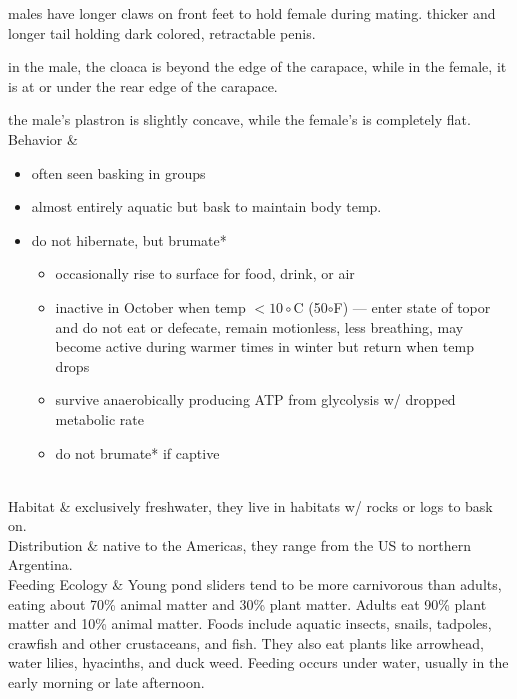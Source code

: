 \begin{center}
\begin{longtabu}
	males have longer claws on front feet to hold female during mating. thicker and longer tail holding dark colored, retractable penis.
	
	in the male, the cloaca is beyond the edge of the carapace, while in the female, it is at or under the rear edge of the carapace.
	
	the male's plastron is slightly concave, while the female's is completely flat.
	\\
	\hline
	Behavior & 
	\begin{itemize}[noitemsep]
		\item often seen basking in groups
		\item almost entirely aquatic but bask to maintain body temp.
		\item do not hibernate, but brumate*
			\begin{itemize}[noitemsep]
				\item occasionally rise to surface for food, drink, or air
				\item inactive in October when temp $< 10\circ$C (50$\circ$F) --- enter state of topor and do not eat or defecate, remain motionless, less breathing, may become active during warmer times in winter but return when temp drops
				\item survive anaerobically producing ATP from glycolysis w/ dropped metabolic rate
				\item do not brumate* if captive
			\end{itemize}
	\end{itemize}	
	\\
	\hline
	Habitat & 
	exclusively freshwater, they live in habitats w/ rocks or logs to bask on.
	\\
	\hline
	Distribution & 
	native to the Americas, they range from the US to northern Argentina.
	\\
	\hline
	Feeding Ecology & 
	Young pond sliders tend to be more carnivorous than adults, eating about 70\% animal matter and 30\% plant matter. Adults eat 90\% plant matter and 10\% animal matter. Foods include aquatic insects, snails, tadpoles, crawfish and other crustaceans, and fish. They also eat plants like arrowhead, water lilies, hyacinths, and duck weed. Feeding occurs under water, usually in the early morning or late afternoon.
	

\end{longtabu}
\end{center}
